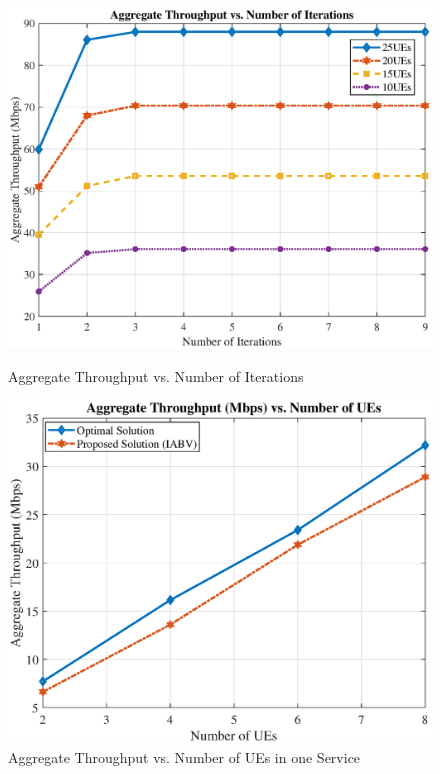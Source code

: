 \documentclass[lettersize,journal]{IEEEtran}
\begin{document}
\begin{figure}%
  \centering
  \captionsetup{justification=centering}
  \begin{minipage}[b]{0.4\textwidth}
     \includegraphics[scale = 0.31]{iter.eps}
  \caption{Aggregate Throughput vs. Number of Iterations}
  \label{fig:11}
  \end{minipage}
    \qquad
  \begin{minipage}[b]{0.4\textwidth}
   \includegraphics[scale = 0.3]{optimal1.eps}
  \caption{Aggregate Throughput vs. Number of UEs in one Service}
  \label{fig:12}
  \end{minipage}
\end{figure}
\end{document}
